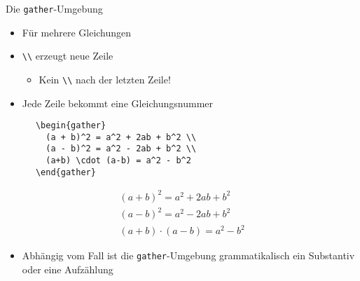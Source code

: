 \begin{frame}[fragile]{Die \texttt{gather}-Umgebung}
  \begin{itemize}
    \item Für mehrere Gleichungen
    \item \lstinline+\\+ erzeugt neue Zeile
      \begin{itemize}
        \item Kein \lstinline+\\+ nach der letzten Zeile!
      \end{itemize}
    \item Jede Zeile bekommt eine Gleichungsnummer
  \end{itemize}
  \begin{CodeExample}{0.54}
    \begin{lstlisting}
      \begin{gather}
        (a + b)^2 = a^2 + 2ab + b^2 \\
        (a - b)^2 = a^2 - 2ab + b^2 \\
        (a+b) \cdot (a-b) = a^2 - b^2
      \end{gather}
    \end{lstlisting}
  \CodeResult
    \begin{minipage}[c][5\baselineskip][c]{\textwidth}
      \begin{gather}
        (a + b)^2 = a^2 + 2ab + b^2 \\
        (a - b)^2 = a^2 - 2ab + b^2 \\
        (a + b) \cdot (a - b) = a^2 - b^2
      \end{gather}
    \end{minipage}
  \end{CodeExample}

  \vspace{1em}
  \begin{itemize}
    \item Abhängig vom Fall ist die \texttt{gather}-Umgebung grammatikalisch ein Substantiv oder eine Aufzählung
  \end{itemize}
\end{frame}

